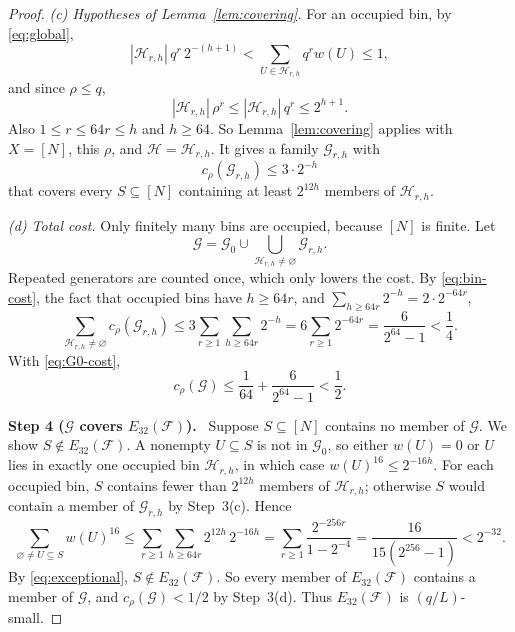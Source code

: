 \documentclass[11pt,letterpaper]{article}
\theoremstyle{definition}
\theoremstyle{remark}
\numberwithin{equation}{section}
\newcommand{\step}[1]{\medskip\noindent\textbf{#1.}\ }
\begin{document}
\begin{proof}
\emph{(c) Hypotheses of Lemma~\ref{lem:covering}.} For an occupied bin, by
\eqref{eq:global},
\[
 |\mathcal H_{r,h}|\,q^r\,2^{-(h+1)}
 <\sum_{U\in\mathcal H_{r,h}}q^r w(U)\le1,
\]
and since $\rho\le q$,
\begin{equation}\label{eq:bin-hyp}
 |\mathcal H_{r,h}|\,\rho^r\le|\mathcal H_{r,h}|\,q^r\le2^{h+1}.
\end{equation}
Also $1\le r\le64r\le h$ and $h\ge64$. So Lemma~\ref{lem:covering} applies
with $X=[N]$, this $\rho$, and $\mathcal H=\mathcal H_{r,h}$. It gives a
family $\mathcal G_{r,h}$ with
\begin{equation}\label{eq:bin-cost}
 c_\rho(\mathcal G_{r,h})\le3\cdot2^{-h}
\end{equation}
that covers every $S\subseteq[N]$ containing at least $2^{12h}$ members of
$\mathcal H_{r,h}$.

\emph{(d) Total cost.} Only finitely many bins are occupied, because $[N]$ is
finite. Let
\[
 \mathcal G=\mathcal G_0\cup\bigcup_{\mathcal H_{r,h}\ne\varnothing}
 \mathcal G_{r,h}.
\]
Repeated generators are counted once, which only lowers the cost. By
\eqref{eq:bin-cost}, the fact that occupied bins have $h\ge64r$, and
$\sum_{h\ge64r}2^{-h}=2\cdot2^{-64r}$,
\[
 \sum_{\mathcal H_{r,h}\ne\varnothing}c_\rho(\mathcal G_{r,h})
 \le3\sum_{r\ge1}\sum_{h\ge64r}2^{-h}
 =6\sum_{r\ge1}2^{-64r}
 =\frac{6}{2^{64}-1}<\frac14.
\]
With \eqref{eq:G0-cost},
\[
 c_\rho(\mathcal G)
 \le\frac1{64}+\frac{6}{2^{64}-1}<\frac12.
\]

\step{Step 4 ($\mathcal G$ covers $E_{32}(\mathcal F)$)}
Suppose $S\subseteq[N]$ contains no member of $\mathcal G$. We show
$S\notin E_{32}(\mathcal F)$. A nonempty $U\subseteq S$ is not in
$\mathcal G_0$, so either $w(U)=0$ or $U$ lies in exactly one occupied bin
$\mathcal H_{r,h}$, in which case $w(U)^{16}\le2^{-16h}$. For each occupied bin,
$S$ contains fewer than $2^{12h}$ members of $\mathcal H_{r,h}$; otherwise $S$
would contain a member of $\mathcal G_{r,h}$ by Step~3(c). Hence
\begin{equation}\label{eq:bin-power}
 \sum_{\varnothing\ne U\subseteq S}w(U)^{16}
 \le\sum_{r\ge1}\sum_{h\ge64r}2^{12h}\,2^{-16h}
 =\sum_{r\ge1}\frac{2^{-256r}}{1-2^{-4}}
 =\frac{16}{15(2^{256}-1)}<2^{-32}.
\end{equation}
By \eqref{eq:exceptional}, $S\notin E_{32}(\mathcal F)$. So every member of
$E_{32}(\mathcal F)$ contains a member of $\mathcal G$, and
$c_\rho(\mathcal G)<1/2$ by Step~3(d). Thus $E_{32}(\mathcal F)$ is
$(q/L)$-small.
\end{proof}
\end{document}
